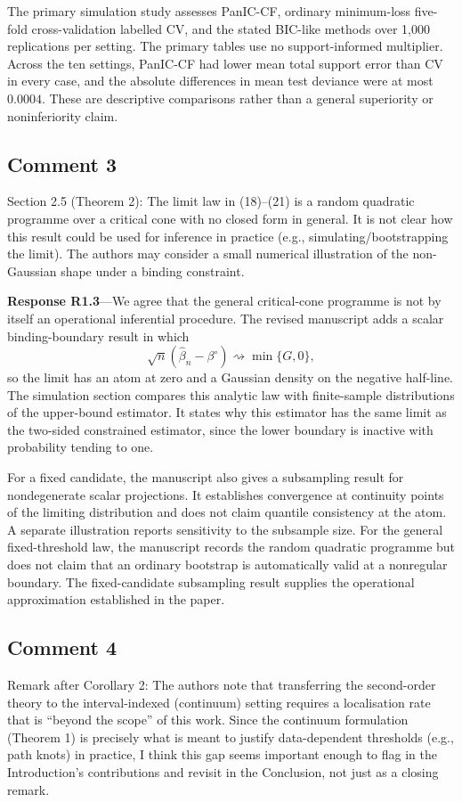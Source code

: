 \documentclass[11pt]{article}
\newcommand{\response}[1]{\par\noindent\textbf{Response #1}---}
\begin{document}
The primary simulation study assesses PanIC-CF, ordinary minimum-loss five-fold cross-validation labelled CV, and the stated BIC-like methods over 1,000 replications per setting. The primary tables use no support-informed multiplier. Across the ten settings, PanIC-CF had lower mean total support error than CV in every case, and the absolute differences in mean test deviance were at most $0.0004$. These are descriptive comparisons rather than a general superiority or noninferiority claim.

\subsection*{Comment 3}
Section 2.5 (Theorem 2): The limit law in (18)--(21) is a random quadratic programme over a critical cone with no closed form in general. It is not clear how this result could be used for inference in practice (e.g., simulating/bootstrapping the limit). The authors may consider a small numerical illustration of the non-Gaussian shape under a binding constraint.

\response{R1.3}We agree that the general critical-cone programme is not by itself an operational inferential procedure. The revised manuscript adds a scalar binding-boundary result in which
\[
\sqrt n(\widehat\beta_n-\beta^\circ)\rightsquigarrow\min\{G,0\},
\]
so the limit has an atom at zero and a Gaussian density on the negative half-line. The simulation section compares this analytic law with finite-sample distributions of the upper-bound estimator. It states why this estimator has the same limit as the two-sided constrained estimator, since the lower boundary is inactive with probability tending to one.

For a fixed candidate, the manuscript also gives a subsampling result for nondegenerate scalar projections. It establishes convergence at continuity points of the limiting distribution and does not claim quantile consistency at the atom. A separate illustration reports sensitivity to the subsample size. For the general fixed-threshold law, the manuscript records the random quadratic programme but does not claim that an ordinary bootstrap is automatically valid at a nonregular boundary. The fixed-candidate subsampling result supplies the operational approximation established in the paper.

\subsection*{Comment 4}
Remark after Corollary 2: The authors note that transferring the second-order theory to the interval-indexed (continuum) setting requires a localisation rate that is ``beyond the scope'' of this work. Since the continuum formulation (Theorem 1) is precisely what is meant to justify data-dependent thresholds (e.g., path knots) in practice, I think this gap seems important enough to flag in the Introduction's contributions and revisit in the Conclusion, not just as a closing remark.
\end{document}
